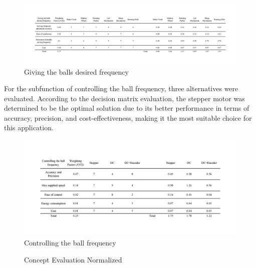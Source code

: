 \documentclass[12pt]{report}
\begin{document}
\begin{figure}[H]
    \centering
    \includegraphics[width=1\textwidth]{Decision matrices/give frequency.png}
    \caption{ Giving the balls desired frequency}
\end{figure}

For the subfunction of controlling the ball frequency, three alternatives were evaluated. According to the decision matrix evaluation, the stepper motor was determined to be the optimal solution due to its better performance in terms of accuracy, precision, and cost-effectiveness, making it the most suitable choice for this application.

\begin{figure}[H]
    \centering
    \includegraphics[width=1\textwidth]{Decision matrices/control frequency.png}
    \caption{Controlling the ball frequency}
\end{figure}


\begin{figure}[H]
    \centering
    \caption{Concept Evaluation Normalized\cite{statista2024}}
    \label{fig:wholesales}
\end{figure}
\end{document}

